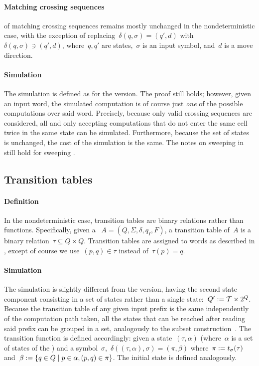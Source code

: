 \paragraph{Matching crossing sequences}  of matching crossing sequences remains mostly unchanged in the nondeterministic case, with the exception of replacing~$\delta(q,\sigma)=(q',d)$ with~$\delta(q,\sigma)\ni(q',d)$, where~$q,q'$ are states,~$\sigma$ is an input symbol, and~$d$ is a move direction.

\paragraph{Simulation} The simulation is defined as for the \TDFA version.
The proof still holds; however, given an input word, the simulated computation is of course just \emph{one} of the possible computations over said word.
Precisely, because only valid crossing sequences are considered, all and only accepting computations that do not enter the same cell twice in the same state can be simulated.
Furthermore, because the set of states is unchanged, the cost of the simulation is the same.
The notes on sweeping \TDFAs in  still hold for sweeping \TNFAs.


\subsection{Transition tables}

\paragraph{Definition} In the nondeterministic case, transition tables are binary relations rather than functions.
Specifically, given a \TNFA~$A=(Q,\Sigma,\delta,q_I,F)$, a transition table of~$A$ is a binary relation~$\tau\subseteq Q\times Q$.
Transition tables are assigned to words as described in , except of course we use~$(p,q)\in\tau$ instead of~$\tau(p)=q$.

\paragraph{Simulation} The simulation is slightly different from the \TDFA version, having the second state component consisting in a set of states rather than a single state:~$Q':=\mathcal T\times2^{Q}$.
Because the transition table of any given input prefix is the same independently of the computation path taken, all the states that can be reached after reading said prefix can be grouped in a set, analogously to the subset construction~\cite{RabSco59,HopUll79}.
The transition function is defined accordingly: given a state~$(\tau,\alpha)$ (where~$\alpha$ is a set of states of the \TNFA) and a symbol~$\sigma$,~$\delta((\tau,\alpha),\sigma)=(\pi,\beta)$ where~$\pi:=t_\sigma(\tau)$ and~$\beta:=\{q\in Q\mid p\in\alpha, (p,q)\in\pi\}$.
The initial state is defined analogously.

